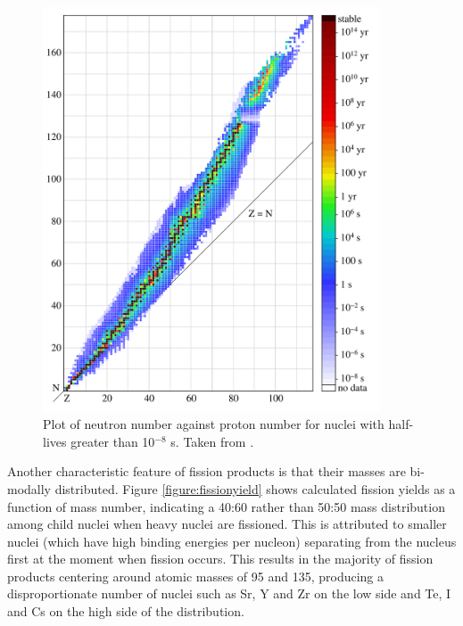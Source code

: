 \begin{figure}[ht]
\centering
\includegraphics[height=12cm]{images/Isotopes_and_half-life.png}
\caption[Plot of neutron number against proton number for nuclei with half-lives greater than 10${^{-8}}$ s.]{Plot of neutron number against proton number for nuclei with half-lives greater than 10${^{-8}}$ s. Taken from \cite{BenRG}.}
\label{figure:NZcurve}
\end{figure}

Another characteristic feature of fission products is that their masses are bi-modally distributed. Figure \ref{figure:fissionyield} shows calculated fission yields as a function of mass number, indicating a 40:60 rather than 50:50 mass distribution among child nuclei when heavy nuclei are fissioned. This is attributed to smaller nuclei (which have high binding energies per nucleon) separating from the nucleus first at the moment when fission occurs. This results in the majority of fission products centering around atomic masses of 95 and 135, producing a disproportionate number of nuclei such as Sr, Y and Zr on the low side and Te, I and Cs on the high side of the distribution. 




